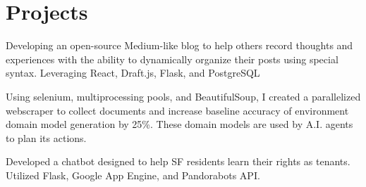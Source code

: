 \documentclass[]{deedy-resume-openfont}
\begin{document}
\begin{minipage}[t]{0.66\textwidth}
\section{Projects}

\begin{tightemize}
\item Developing an open-source Medium-like blog to help others record thoughts and experiences with the ability to dynamically organize their posts using special syntax. Leveraging React, Draft.js, Flask, and PostgreSQL
\end{tightemize}
\sectionsep

\begin{tightemize}
\item Using selenium, multiprocessing pools, and BeautifulSoup, I created a parallelized webscraper to collect documents and increase baseline accuracy of environment domain model generation by 25\%. These domain models are used by A.I. agents to plan its actions.
\end{tightemize}
\sectionsep




\begin{tightemize}
\item Developed a chatbot designed to help SF residents learn their rights as tenants. Utilized Flask, Google App Engine, and Pandorabots API.
\end{tightemize}
\sectionsep

\end{minipage}
\end{document}
